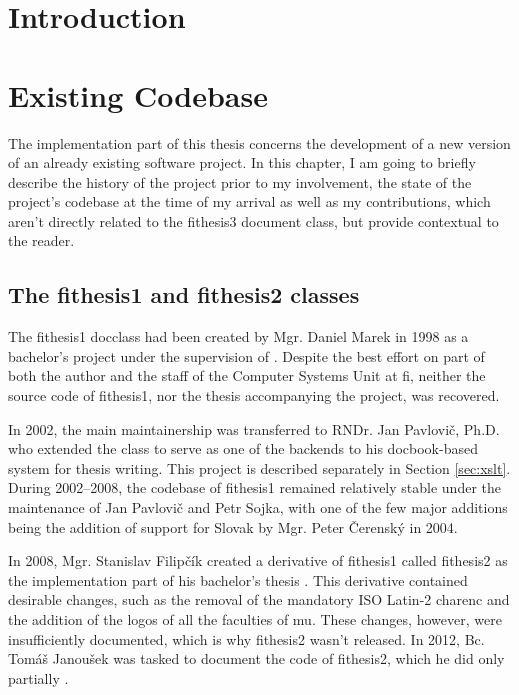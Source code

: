 \documentclass[12pt,twoside,cover,color,table]%
  {fithesis3/fithesis3/fithesis3} %
\makeatletter
\def\thesis#1{\makeatletter\thesis@{#1}\makeatother}
\makeatother
\begin{document}
\chapter{Introduction}
\chapter{Existing Codebase}\label{sec:init-state}
  The implementation part of this thesis concerns the development
  of a new version of an already existing software project. In this
  chapter, I am going to briefly describe the history of the
  project prior to my involvement, the state of the project's
  codebase at the time of my arrival as well as my contributions,
  which aren't directly related to the \textsf{fithesis3} document
  class, but provide contextual to the reader.

  \section{The \textsf{fithesis1} and \textsf{fithesis2}
    classes}
  The \textsf{fithesis1} \gls{docclass} had been created by Mgr.
  Daniel Marek in 1998 as a bachelor's project under the
  supervision of \thesis{advisor}. Despite the best effort on part
  of both the author and the staff of the Computer Systems Unit at
  \gls{fi}, neither the source code of \textsf{fithesis1}, nor the
  thesis accompanying the project, was recovered.

  In 2002, the main maintainership was transferred to RNDr. Jan
  Pavlovič, Ph.D. who extended the class to serve as one of the
  backends to his \gls{docbook}-based system for thesis writing.
  This project is described separately in Section \ref{sec:xslt}.
  During 2002--2008, the codebase of \textsf{fithesis1} remained
  relatively stable under the maintenance of Jan Pavlovič and Petr
  Sojka, with one of the few major additions being the addition of
  support for Slovak by Mgr. Peter Čerenský in 2004.

  In 2008, Mgr. Stanislav Filipčík created a derivative of
  \textsf{fithesis1} called \textsf{fithesis2} as the
  implementation part of his bachelor's thesis \cite{Filipcik09}.
  This derivative contained desirable changes, such as the removal
  of the mandatory ISO Latin-2 \gls{charenc} and the addition of
  the logos of all the faculties of \gls{mu}. These changes,
  however, were insufficiently documented, which is why
  \textsf{fithesis2} wasn't released. In 2012, Bc. Tomáš Janoušek
  was tasked to document the code of \textsf{fithesis2}, which he
  did only partially \cite{fithesis2Code}.
\end{document}

